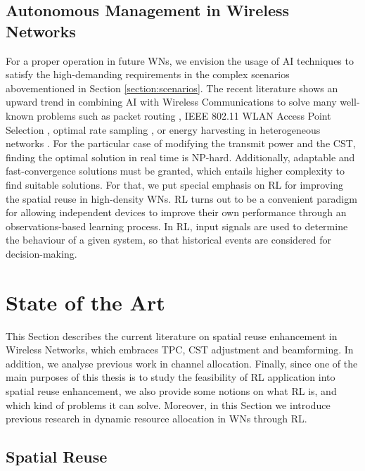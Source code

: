 \documentclass[12pt, a4paper,twoside]{tesi_upf}
\begin{document}
		\section{Autonomous Management in Wireless Networks}
		\label{section:rl_vision}		
			For a proper operation in future WNs, we envision the usage of AI techniques to satisfy the high-demanding requirements in the complex scenarios abovementioned in Section \ref{section:scenarios}. The recent literature shows an upward trend in combining AI with Wireless Communications to solve many well-known problems such as packet routing \cite{littman1993distributed}, IEEE 802.11 WLAN Access Point Selection \cite{bojovic2011supervised, bojovic2012neural}, optimal rate sampling \cite{combes2014optimal}, or energy harvesting in heterogeneous networks \cite{miozzo2015distributed}. For the particular case of modifying the transmit power and the CST, finding the optimal solution in real time is NP-hard. Additionally, adaptable and fast-convergence solutions must be granted, which entails higher complexity to find suitable solutions. For that, we put special emphasis on RL for improving the spatial reuse in high-density WNs. RL turns out to be a convenient paradigm for allowing independent devices to improve their own performance through an observations-based learning process. In RL, input signals are used to determine the behaviour of a given system, so that historical events are considered for decision-making. 
			
	\chapter{State of the Art}
	\label{section:state_of_the_art}
		This Section describes the current literature on spatial reuse enhancement in Wireless Networks, which embraces TPC, CST adjustment and beamforming. In addition, we analyse previous work in channel allocation. Finally, since one of the main purposes of this thesis is to study the feasibility of RL application into spatial reuse enhancement, we also provide some notions on what RL is, and which kind of problems it can solve. Moreover, in this Section we introduce previous research in dynamic resource allocation in WNs through RL. 
			
		\section{Spatial Reuse}		
		\label{section:spatial_reuse_soa}			
						
\end{document}
